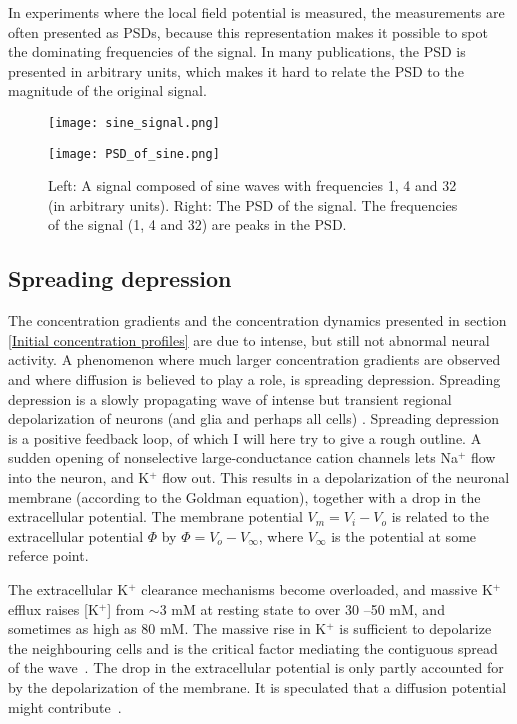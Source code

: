 \documentclass{article}
\begin{document}
In experiments where the local field potential is measured, the measurements are often presented as PSDs, because this representation makes it possible to spot the dominating frequencies of the signal. In many publications, the PSD is presented in arbitrary units, which makes it hard to relate the PSD to the magnitude of the original signal.

\begin{figure}[!tbp]
  \centering
  \begin{minipage}[b]{0.45\textwidth}
    \texttt{[image: sine\_signal.png]}
  \end{minipage}
  \begin{minipage}[b]{0.45\textwidth}
    \texttt{[image: PSD\_of\_sine.png]}
  \end{minipage}  
   \caption{Left: A signal composed of sine waves with frequencies 1, 4 and 32 (in arbitrary units).  Right: The PSD of the signal. The frequencies of the signal (1, 4 and 32) are peaks in the PSD. }
  \label{fig:PSD_of_sine}
\end{figure}

\subsection{Spreading depression}\label{SD}
The concentration gradients and the concentration dynamics presented in section \ref{Initial concentration profiles} are due to intense, but still not abnormal neural activity. A phenomenon where much larger concentration gradients are observed and where diffusion is believed to play a role, is spreading depression. Spreading depression is a slowly propagating wave of intense but transient
regional depolarization of neurons (and glia and perhaps all cells) \cite{Ataya2015}. Spreading depression is a positive feedback loop, of which I will here try to give a rough outline. A sudden opening of nonselective large-conductance cation channels lets Na$^+$ flow into the neuron, and K$^+$ flow out. This results in a depolarization of the neuronal membrane (according to the Goldman equation), together with a drop in the extracellular potential. The membrane potential $V_m=V_i-V_o$ is related to the extracellular potential $\Phi$ by $\Phi = V_o - V_{\infty}$, where $V_{\infty}$ is the potential at some referce point. 

The extracellular K$^+$ clearance mechanisms become overloaded, and massive K$^+$ efflux raises [K$^+$] from $ \sim 3$ mM at resting state
to over 30 –50 mM, and sometimes as
high as 80 mM. The massive rise in K$^+$ is sufficient to depolarize the neighbouring cells and is the critical factor mediating the contiguous spread of
the wave~\cite{Ataya2015}. The drop in the extracellular potential is only partly accounted for by the depolarization of the membrane. It is speculated that a diffusion potential might contribute~\cite{Herreras1993}. 
\end{document}
